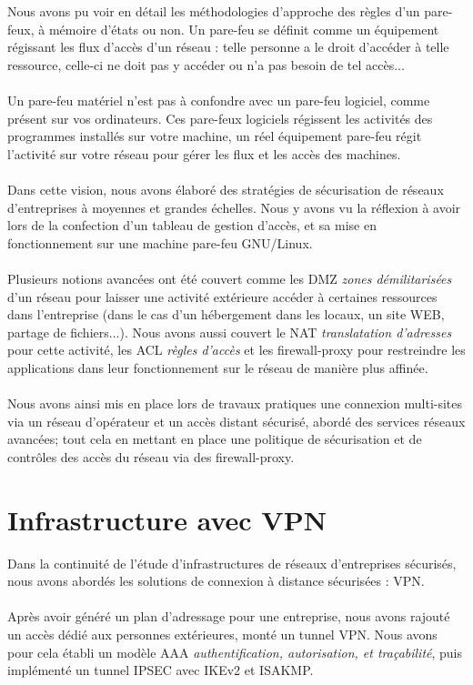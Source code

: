 Nous avons pu voir en détail les méthodologies d'approche des règles d'un pare-feux, à mémoire d'états ou non. Un pare-feu se définit comme un équipement régissant les flux d'accès d'un réseau : telle personne a le droit d'accéder à telle ressource, celle-ci ne doit pas y accéder ou n'a pas besoin de tel accès...
\\ \\
Un pare-feu matériel n'est pas à confondre avec un pare-feu logiciel, comme présent sur vos ordinateurs. Ces pare-feux logiciels régissent les activités des programmes installés sur votre machine, un réel équipement pare-feu régit l'activité sur votre réseau pour gérer les flux et les accès des machines.
\\ \\
Dans cette vision, nous avons élaboré des stratégies de sécurisation de réseaux d'entreprises à moyennes et grandes échelles. Nous y avons vu la réflexion à avoir lors de la confection d'un tableau de gestion d'accès, et sa mise en fonctionnement sur une machine pare-feu GNU/Linux.
\\ \\
Plusieurs notions avancées ont été couvert comme les DMZ \textit{zones démilitarisées} d'un réseau pour laisser une activité extérieure accéder à certaines ressources dans l'entreprise (dans le cas d'un hébergement dans les locaux, un site WEB, partage de fichiers...). Nous avons aussi couvert le NAT \textit{translatation d'adresses} pour cette activité, les ACL \textit{règles d'accès} et les firewall-proxy pour restreindre les applications dans leur fonctionnement sur le réseau de manière plus affinée.
\\ \\
Nous avons ainsi mis en place lors de travaux pratiques une connexion multi-sites via un réseau d'opérateur et un accès distant sécurisé, abordé des services réseaux avancées; tout cela en mettant en place une politique de sécurisation et de contrôles des accès du réseau via des firewall-proxy.

\section{Infrastructure avec VPN}

Dans la continuité de l'étude d'infrastructures de réseaux d'entreprises sécurisés, nous avons abordés les solutions de connexion à distance sécurisées : VPN.
\\ \\
Après avoir généré un plan d'adressage pour une entreprise, nous avons rajouté un accès dédié aux personnes extérieures, monté un tunnel VPN. Nous avons pour cela établi un modèle AAA \textit{authentification, autorisation, et traçabilité}, puis implémenté un tunnel IPSEC avec IKEv2 et ISAKMP.